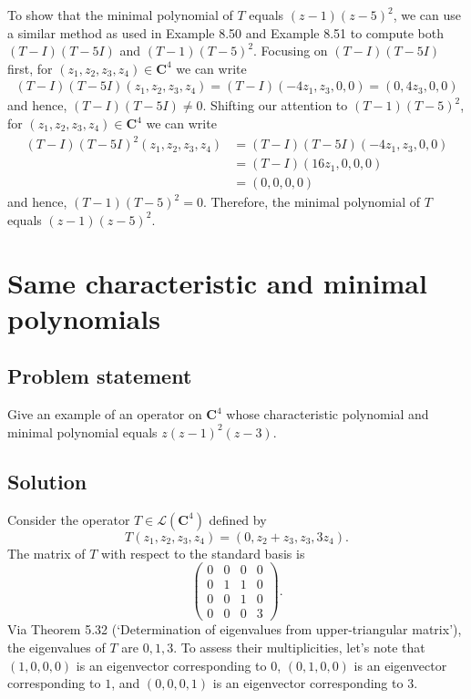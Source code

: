 \documentclass{article}
\begin{document}
To show that the minimal polynomial of $T$ equals $(z-1)(z-5)^2$, we can use a similar method as used in Example 8.50 and Example 8.51 to compute both $(T-I)(T-5I)$ and $(T-1)(T-5)^2$. Focusing on $(T-I)(T-5I)$ first, for $(z_1,z_2,z_3,z_4)\in\mathbf{C}^4$ we can write
\begin{align*}
    (T-I)(T-5I)(z_1,z_2,z_3,z_4)=(T-I)(-4z_1,z_3,0,0)=(0,4z_3,0,0)
\end{align*}
and hence, $(T-I)(T-5I)\neq 0$. 
Shifting our attention to $(T-1)(T-5)^2$, for $(z_1,z_2,z_3,z_4)\in\mathbf{C}^4$ we can write
\begin{align*}
    (T-I)(T-5I)^2(z_1,z_2,z_3,z_4)&=(T-I)(T-5I)(-4z_1,z_3,0,0)\\
    &=(T-I)(16z_1,0,0,0)\\
    &=(0,0,0,0)
\end{align*}
and hence, $(T-1)(T-5)^2 =0$. Therefore, the minimal polynomial of $T$ equals $(z-1)(z-5)^2$.

\clearpage

\section{Same characteristic and minimal polynomials}
\subsection*{Problem statement}
Give an example of an operator on $\mathbf{C}^4$ whose characteristic polynomial and minimal polynomial equals $z(z-1)^2(z-3)$.

\subsection*{Solution}
Consider the operator $T\in\mathcal{L}(\mathbf{C}^4)$ defined by
\begin{equation*}
T(z_1,z_2,z_3,z_4)=(0,z_2+z_3,z_3,3z_4).
\end{equation*}
The matrix of $T$ with respect to the standard basis is
\begin{equation*}
\begin{pmatrix}
0 & 0 & 0 & 0\\
0 & 1 & 1 & 0\\
0 & 0 & 1 & 0\\
0 & 0 & 0 & 3
\end{pmatrix}.
\end{equation*}
Via Theorem 5.32 (`Determination of eigenvalues from upper-triangular matrix'), the eigenvalues of $T$ are $0,1,3$. 
To assess their multiplicities, let's note that $(1,0,0,0)$ is an eigenvector corresponding to $0$, $(0,1,0,0)$ is an eigenvector corresponding to $1$, and $(0,0,0,1)$ is an eigenvector corresponding to $3$. 
\end{document}
